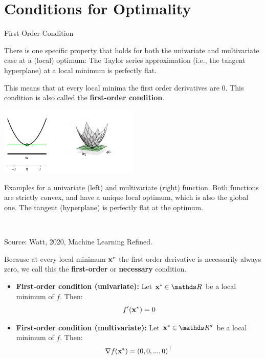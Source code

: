   \section{Conditions for Optimality}
  
  \begin{vbframe}{First Order Condition}
  
  There is one specific property that holds for both the univariate and multivariate case at a (local) optimum: The Taylor series approximation (i.e., the tangent hyperplane) at a local minimum is perfectly flat. 
  
  \vspace*{0.2cm}
  
  This means that at every local minima the first order derivatives are $0$. This condition is also called the \textbf{first-order condition}. 
  
  
  \begin{center}
  \includegraphics[width = 0.5\textwidth]{figure_man/first_order.png} \\
  \begin{footnotesize}
  Examples for a univariate (left) and multivariate (right) function. Both functions are strictly convex, and have a unique local optimum, which is also the global one. The tangent (hyperplane) is perfectly flat at the optimum. \end{footnotesize}\\
  \begin{tiny}
  Source: Watt, 2020, Machine Learning Refined. 
  \end{tiny}
  \end{center}
  
  \framebreak 
  
  Because at every local minimum $\mathbf{x}^\ast$ the first order derivative is necessarily always zero, we call this the \textbf{first-order} or \textbf{necessary} condition. 
  
  \begin{itemize}
    \item \textbf{First-order condition (univariate): } Let $\xv^\ast \in \R$ be a local minimum of $f$. Then:
    $$
    f'(\mathbf{x}^\ast) = 0
    $$
    \item \textbf{First-order condition (multivariate): } Let $\xv^\ast \in \R^d$ be a local minimum of $f$. Then:
    $$
    \nabla f(\mathbf{x}^\ast) = (0, 0, ..., 0)^\top
    $$
  

\end{itemize}
\end{vbframe}
